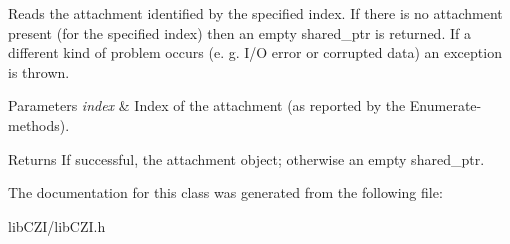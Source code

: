 Reads the attachment identified by the specified index. If there is no attachment present (for the specified index) then an empty shared\+\_\+ptr is returned. If a different kind of problem occurs (e. g. I/O error or corrupted data) an exception is thrown. 
\begin{DoxyParams}{Parameters}
{\em index} & Index of the attachment (as reported by the Enumerate-\/methods). \\
\hline
\end{DoxyParams}
\begin{DoxyReturn}{Returns}
If successful, the attachment object; otherwise an empty shared\+\_\+ptr. 
\end{DoxyReturn}


The documentation for this class was generated from the following file\+:\begin{DoxyCompactItemize}
\item 
lib\+C\+Z\+I/lib\+C\+Z\+I.\+h\end{DoxyCompactItemize}
